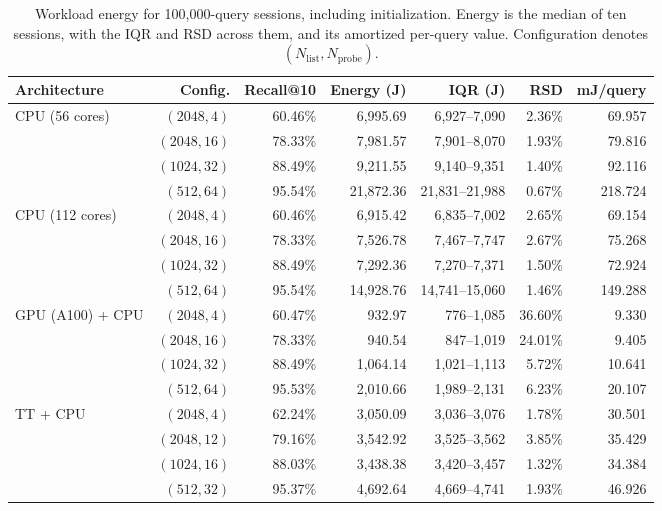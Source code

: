 \begin{table}[htbp]
\centering
\caption{Workload energy for 100,000-query sessions, including
initialization. Energy is the median of ten sessions, with the IQR and RSD
across them, and its amortized per-query value. Configuration denotes
\((N_{\mathrm{list}},N_{\mathrm{probe}})\).}
\label{tab:energy-recall}
\small
\setlength{\tabcolsep}{2.4pt}
\renewcommand{\arraystretch}{1.08}
\begin{tabular}{lrrrrrr}
\toprule
Architecture & Config. & Recall@10 & Energy (J) & IQR (J) & RSD & mJ/query \\
\midrule
CPU (56 cores)  & \((2048,4)\)  & 60.46\% & 6,995.69  & 6,927--7,090   & 2.36\% & 69.957 \\
                & \((2048,16)\) & 78.33\% & 7,981.57  & 7,901--8,070   & 1.93\% & 79.816 \\
                & \((1024,32)\) & 88.49\% & 9,211.55  & 9,140--9,351   & 1.40\% & 92.116 \\
                & \((512,64)\)  & 95.54\% & 21,872.36 & 21,831--21,988 & 0.67\% & 218.724 \\
\midrule
CPU (112 cores) & \((2048,4)\)  & 60.46\% & 6,915.42  & 6,835--7,002   & 2.65\% & 69.154 \\
                & \((2048,16)\) & 78.33\% & 7,526.78  & 7,467--7,747   & 2.67\% & 75.268 \\
                & \((1024,32)\) & 88.49\% & 7,292.36  & 7,270--7,371   & 1.50\% & 72.924 \\
                & \((512,64)\)  & 95.54\% & 14,928.76 & 14,741--15,060 & 1.46\% & 149.288 \\
\midrule
GPU (A100) + CPU & \((2048,4)\)  & 60.47\% & 932.97   & 776--1,085   & 36.60\% & 9.330 \\
                 & \((2048,16)\) & 78.33\% & 940.54   & 847--1,019   & 24.01\% & 9.405 \\
                 & \((1024,32)\) & 88.49\% & 1,064.14 & 1,021--1,113 & 5.72\%  & 10.641 \\
                 & \((512,64)\)  & 95.53\% & 2,010.66 & 1,989--2,131 & 6.23\%  & 20.107 \\
\midrule
TT + CPU         & \((2048,4)\)  & 62.24\% & 3,050.09 & 3,036--3,076 & 1.78\% & 30.501 \\
                 & \((2048,12)\) & 79.16\% & 3,542.92 & 3,525--3,562 & 3.85\% & 35.429 \\
                 & \((1024,16)\) & 88.03\% & 3,438.38 & 3,420--3,457 & 1.32\% & 34.384 \\
                 & \((512,32)\)  & 95.37\% & 4,692.64 & 4,669--4,741 & 1.93\% & 46.926 \\
\bottomrule
\end{tabular}
\end{table}

